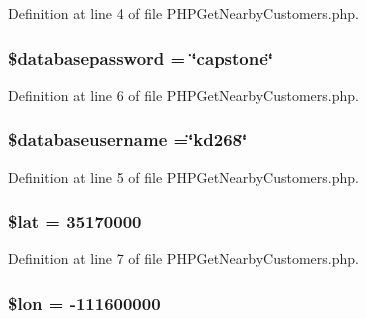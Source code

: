 Definition at line 4 of file P\-H\-P\-Get\-Nearby\-Customers.\-php.

\hypertarget{_p_h_p_get_nearby_customers_8php_a1a07536b6a5f43f2d8f826bd2ee6c91a}{
\subsubsection[{\$databasepassword}]{\setlength{\rightskip}{0pt plus 5cm}\$databasepassword = \char`\"{}capstone\char`\"{}}}\label{_p_h_p_get_nearby_customers_8php_a1a07536b6a5f43f2d8f826bd2ee6c91a}


Definition at line 6 of file P\-H\-P\-Get\-Nearby\-Customers.\-php.

\hypertarget{_p_h_p_get_nearby_customers_8php_a251bf75f510d7c8b556c65d7c30e911f}{
\subsubsection[{\$databaseusername}]{\setlength{\rightskip}{0pt plus 5cm}\$databaseusername =\char`\"{}kd268\char`\"{}}}\label{_p_h_p_get_nearby_customers_8php_a251bf75f510d7c8b556c65d7c30e911f}


Definition at line 5 of file P\-H\-P\-Get\-Nearby\-Customers.\-php.

\hypertarget{_p_h_p_get_nearby_customers_8php_af498b42b83afed4dfe0af05fd802776c}{
\subsubsection[{\$lat}]{\setlength{\rightskip}{0pt plus 5cm}\$lat = 35170000}}\label{_p_h_p_get_nearby_customers_8php_af498b42b83afed4dfe0af05fd802776c}


Definition at line 7 of file P\-H\-P\-Get\-Nearby\-Customers.\-php.

\hypertarget{_p_h_p_get_nearby_customers_8php_a03836509761c0935d0c55370b184ccd6}{
\subsubsection[{\$lon}]{\setlength{\rightskip}{0pt plus 5cm}\$lon = -\/111600000}}\label{_p_h_p_get_nearby_customers_8php_a03836509761c0935d0c55370b184ccd6}


